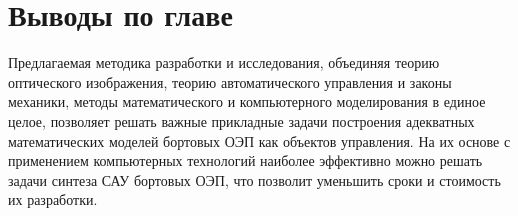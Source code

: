 \begin{comment}
Приведенная методика была апробирована при разработке ряда САУ ОЭП \cite[]{Belyakov}, \cite[]{Torshina},\cite[]{Malivanov-a2-9}, \cite[]{Burdinov-a2-10}, \cite[]{Sokolski22}, \cite[]{Dubovik-a2-12}. Каждому из блоков на рисунке~\ref{fig:tikz_example} присущи своя специфика и его математическое или логическое описание и предполагается соответствующая методика его реализации. Сущность их раскроем ниже.
\end{comment}

\section{Выводы по главе} \label{sec:ch2/sec9}

Предлагаемая методика разработки и исследования, объединяя теорию оптического изображения, теорию автоматического управления и законы механики, методы математического и компьютерного моделирования в единое целое, позволяет решать важные прикладные задачи построения адекватных математических моделей бортовых ОЭП как объектов управления. На их основе с применением компьютерных технологий наиболее эффективно можно решать задачи синтеза САУ бортовых ОЭП, что позволит уменьшить сроки и стоимость их разработки. 

\clearpage